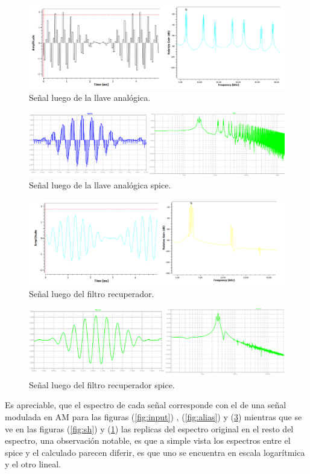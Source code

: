 \begin{figure}[H]
	\centering
	\includegraphics[width=1\textwidth]{ImagenesEjercicio7/analog.PNG}
\caption{Señal luego de la llave analógica.}
	\label{fig:analog}
\end{figure}

\begin{figure}[H]
	\centering
	\includegraphics[width=1\textwidth]{ImagenesEjercicio7/sanalog.PNG}
\caption{Señal luego de la llave analógica spice.}
	\label{fig:sanalog}
\end{figure}

\begin{figure}[H]
	\centering
	\includegraphics[width=1\textwidth]{ImagenesEjercicio7/recovery.PNG}
\caption{Señal luego del filtro recuperador.}
	\label{fig:recovery}
\end{figure}

\begin{figure}[H]
	\centering
	\includegraphics[width=1\textwidth]{ImagenesEjercicio7/srecovery.PNG}
\caption{Señal luego del filtro recuperador spice.}
	\label{fig:srecovery}
\end{figure}
Es apreciable, que el espectro de cada señal corresponde con el de una señal modulada en AM para las figuras (\ref{fig:input}) , (\ref{fig:alias}) y (\ref{fig:recovery}) mientras que se ve en las figuras (\ref{fig:sh}) y (\ref{fig:analog}) las replicas del espectro original en el resto del espectro, una observación notable, es que a simple vista los espectros entre el spice y el calculado parecen diferir, es que uno se encuentra en escala logarítmica y el otro lineal.
